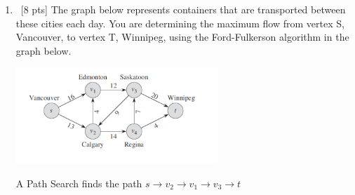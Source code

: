 \documentclass[12pt]{article}
\newenvironment{sol}[1][Solution]{\begin{trivlist}\item[\hskip\labelsep {\bfseries #1:}]}{\end{trivlist}}
\begin{document}
\begin{enumerate}
    
    \item \ [8 pts] The graph below represents containers that are transported between these cities each day. You are determining the maximum flow from vertex S, Vancouver, to vertex T, Winnipeg, using the Ford-Fulkerson algorithm in the graph below.
        \begin{center}
            \includegraphics[width = 0.6\textwidth]{p5.png}
        \end{center}
        A Path Search finds the path $s \rightarrow v_2 \rightarrow v_1 \rightarrow v_3 \rightarrow t$
\end{enumerate}
\end{document}
